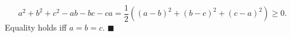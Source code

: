 \[a^2+b^2+c^2-ab-bc-ca=\dfrac12\left((a-b)^2+(b-c)^2+(c-a)^2\right)\ge0.\]
Equality holds iff $a=b=c$. $\blacksquare$
